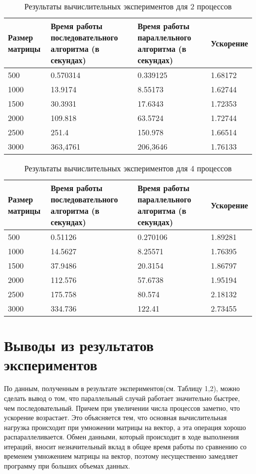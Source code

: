 \documentclass{report}
\begin{document}
\begin{table}[!h]
\caption{Результаты вычислительных экспериментов для 2 процессов}
\centering
\begin{tabular}{| p{2cm} | p{3cm} | p{4cm} | p{2cm} |}
\hline
Размер матрицы & Время работы последовательного алгоритма (в секундах) & Время работы параллельного алгоритма (в секундах) & Ускорение  \\[5pt]
\hline
500        & 0.570314   & 0.339125    & 1.68172       \\
1000       & 13.9174    & 8.55173     & 1.62744       \\
1500       & 30.3931    & 17.6343     & 1.72353       \\
2000       & 109.818    & 63.5724     & 1.72744       \\
2500       & 251.4      & 150.978     & 1.66514       \\
3000       & 363,4761   & 206,3646    & 1.76133      \\
\hline
\end{tabular}
\end{table}

\begin{table}[!h]
\caption{Результаты вычислительных экспериментов для 4 процессов}
\centering
\begin{tabular}{| p{2cm} | p{3cm} | p{4cm} | p{2cm} |}
\hline
Размер матрицы & Время работы последовательного алгоритма (в секундах) & 
Время работы параллельного алгоритма (в секундах) & Ускорение  \\[5pt]
\hline
500        & 0.51126    & 0.270106    & 1.89281       \\
1000       & 14.5627    & 8.25571     & 1.76395       \\
1500       & 37.9486    & 20.3154     & 1.86797       \\
2000       & 112.576    & 57.6738     & 1.95194       \\
2500       & 175.758    & 80.574      & 2.18132       \\
3000       & 334.736    & 122.41      & 2.73455       \\
\hline
\end{tabular}
\end{table}

\newpage

\section*{Выводы из результатов экспериментов}
По данным, полученным в результате экспериментов(см. Таблицу 1,2), можно сделать вывод о том, что параллельный случай работает значительно быстрее, чем последовательный. Причем при увеличении числа процессов заметно, что ускорение возрастает. Это объясняется тем, что основная вычислительная нагрузка происходит при умножении матрицы на вектор, а эта операция хорошо распараллеливается. Обмен данными, который происходит в ходе выполнения итераций, вносит незначительный вклад в общее время работы по сравнению со временем умножением матрицы на вектор, поэтому несущественно замедляет программу при больших объемах данных.
\end{document}
